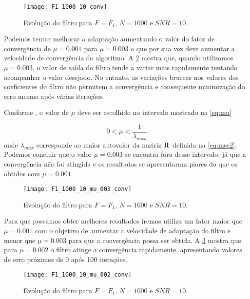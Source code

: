 \begin{figure}
	\centering
	\texttt{[image: F1\_1000\_10\_conv]}
	\caption{Evolução do filtro para $ F=F_1 $, $ N=1000 $ e $ SNR=10 $.}
	\label{fig:F1_1000_10_conv}
\end{figure}

Podemos tentar melhorar a adaptação aumentando o valor do fator de convergência de $ \mu=0.001 $ para $ \mu=0.003 $ o que por sua vez deve aumentar a velocidade de convergência do algoritmo. A \cref{fig:F1_1000_10_mu_003_conv} mostra que, quando utilizamos $ \mu = 0.003 $, o valor de saída do filtro tende a variar mais rapidamente tentando acompanhar o valor desejado. No entanto, as variações bruscas nos valores dos coeficientes do filtro não permitem a convergência e consequente minimização do erro mesmo após várias iterações. 

Conforme \citet{diniz1997adaptive}, o valor de $ \mu $ deve ser escolhido no intervalo mostrado na \cref{eq:mu}

\begin{equation}\label{eq:mu}
0 < \mu < \frac{1}{\lambda_{max}}
\end{equation}
onde $ \lambda_{max} $ corresponde ao maior autovalor da matriz $ {\bf R} $ definida na \cref{eq:mse2}. Podemos concluir que o valor $ \mu = 0.003 $ se encontra fora desse intervalo, já que a convergência não foi atingida e os resultados se apresentaram piores do que os obtidos com $ \mu=0.001 $. 

\begin{figure}
	\centering
	\texttt{[image: F1\_1000\_10\_mu\_003\_conv]}
	\caption{Evolução do filtro para $ F=F_1 $, $ N=1000 $ e $ SNR=10 $.}
	\label{fig:F1_1000_10_mu_003_conv}
\end{figure}

Para que possamos obter melhores resultados iremos utiliza um fator maior que $ \mu=0.001 $ com o objetivo de aumentar a velocidade de adaptação do filtro e menor que $ \mu=0.003 $ para que a convergência possa ser obtida. A \cref{fig:F1_1000_10_mu_002_conv} mostra que para $ \mu=0.002 $ o filtro atinge a convergência rapidamente, apresentando valores de erro próximos de 0 após 100 iterações.

\begin{figure}
	\centering
	\texttt{[image: F1\_1000\_10\_mu\_002\_conv]}
	\caption{Evolução do filtro para $ F=F_1 $, $ N=1000 $ e $ SNR=10 $.}
	\label{fig:F1_1000_10_mu_002_conv}
\end{figure}

